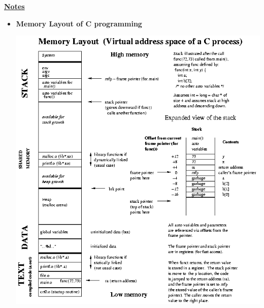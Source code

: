 \documentclass[12pt]{article}
\begin{document}
\begin{enumerate}[1.]
    \bigskip

    \underline{\textbf{Notes}}

    \begin{itemize}
        \item \textbf{Memory Layout of C programming}

        \begin{center}
            \includegraphics[width=\linewidth]{images/worksheet_6_solution_7.png}
            \end{center}


    \end{itemize}

\end{enumerate}
\end{document}
